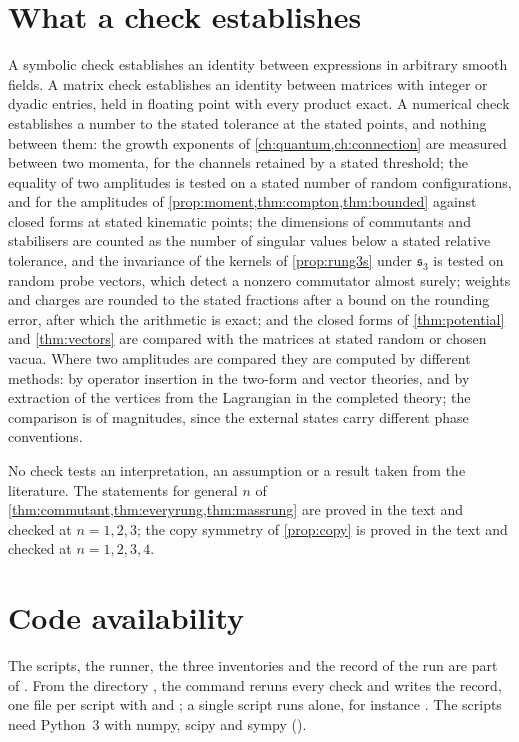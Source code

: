 \section{What a check establishes}

A symbolic check establishes an identity between expressions in arbitrary smooth fields. A matrix check establishes an identity between
matrices with integer or dyadic entries, held in floating point with every product exact. A numerical check establishes a number to the
stated tolerance at the stated points, and nothing between them: the growth exponents of \cref{ch:quantum,ch:connection} are measured
between two momenta, for the channels retained by a stated threshold; the equality of two amplitudes is tested on a stated number of random configurations, and for the amplitudes of
\cref{prop:moment,thm:compton,thm:bounded} against closed forms at stated kinematic points; the dimensions of commutants and stabilisers are
counted as the number of singular values below a stated relative tolerance, and the invariance of the kernels of \cref{prop:rung3s} under
$\mathfrak s_3$ is tested on random probe vectors, which detect a nonzero commutator almost surely; weights and charges are rounded to the stated fractions after a
bound on the rounding error, after which the arithmetic is exact; and the closed forms of \cref{thm:potential} and \cref{thm:vectors} are
compared with the matrices at stated random or chosen vacua. Where two amplitudes are compared they are computed by different methods: by
operator insertion in the two-form and vector theories, and by extraction of the vertices from the Lagrangian in the completed theory; the
comparison is of magnitudes, since the external states carry different phase conventions.

No check tests an interpretation, an assumption or a result taken from the literature. The statements for general $n$ of
\cref{thm:commutant,thm:everyrung,thm:massrung} are proved in the text and checked at $n=1,2,3$; the copy symmetry of \cref{prop:copy} is
proved in the text and checked at $n=1,2,3,4$.

\section{Code availability}

The scripts, the runner, the three inventories and the record of the run are part of \codearchive. From the directory , the
command  reruns every check and writes the record, one file per script with  and
; a single script runs alone, for instance . The scripts need Python~3 with numpy, scipy
and sympy ().
